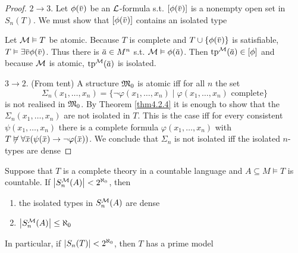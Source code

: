 \documentclass[11pt]{article}
\begin{document}
\begin{proof}
\(2\to 3\). Let \(\phi(\barv)\) be an \(\mathcal{L}\)-formula s.t. \([\phi(\barv)]\) is a nonempty open set
in \(S_n(T)\). We must show that \([\phi(\barv)]\) contains an isolated type

Let \(\mathcal{M}\vDash T\) be atomic. Because \(T\) is complete and \(T\cup\{\phi(\barv)\}\) is
satisfiable, \(T\vDash\exists\barv\phi(\barv)\). Thus there is \(\bara\in M^n\) s.t. \(\calm\vDash\phi(\bara)\).
Then \(\tp^{\calm}(\bara)\in[\phi]\) and because \(\mathcal{M}\) is atomic, \(\tp^{\calm}(\bara)\) is isolated.

\(3\to 2\). (From tent) A structure \(\mathfrak{M}_0\) is atomic iff for all \(n\) the set
\begin{equation*}
\Sigma_n(x_1,\dots,x_n)=\{\neg\varphi(x_1,\dots,x_n)\mid\varphi(x_1,\dots,x_n)\text{ complete}\}
\end{equation*}
is not realised in \(\mathfrak{M}_0\). By Theorem \ref{thm4.2.4} it is enough to show that
the \(\Sigma_n(x_1,\dots,x_n)\)  are not isolated in \(T\). This is the case iff for every
consistent \(\psi(x_1,\dots,x_n)\) there is a complete formula \(\varphi(x_1,\dots,x_n)\)
with \(T\not\vDash\forall\barx(\psi(\barx)\to\neg\varphi(\barx))\). We conclude that \(\Sigma_n\) is not isolated iff the
isolated \(n\)-types are dense
\end{proof}

\begin{theorem}[]
\label{thm4.2.11}
Suppose that \(T\) is a complete theory in a countable language and \(A\subseteq M\vDash T\) is countable.
If \(\abs{S_n^{\calm}(A)}<2^{\aleph_0}\), then
\begin{enumerate}
\item the isolated types in \(S_n^{\mathcal{M}}(A)\) are dense
\item \(\abs{S_n^{\calm}(A)}\le\aleph_0\)
\end{enumerate}


In particular, if \(\abs{S_n(T)}<2^{\aleph_0}\), then \(T\) has a prime model
\end{theorem}
\end{document}
